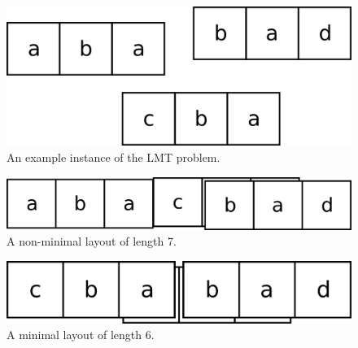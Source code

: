 \begin{figure}
  \caption{An example instance of the LMT problem.}
  \includegraphics{example-instance}
\end{figure}

\begin{figure}
  \caption{A non-minimal layout of length 7.}
  \includegraphics{non-minimal}
\end{figure}

\begin{figure}
  \caption{A minimal layout of length 6.}
  \includegraphics{minimal}
\end{figure}
